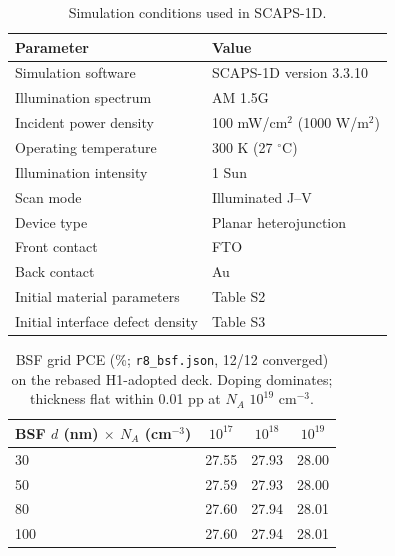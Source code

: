 \documentclass[11pt]{article}
\begin{document}
\begin{table}[htbp]
\centering
{\small\setlength{\tabcolsep}{3pt}
\begin{tabularx}{\textwidth}{XX}
\hline
Parameter & Value
\\\hline
Simulation software & SCAPS-1D version 3.3.10\\
Illumination spectrum & AM 1.5G\\
Incident power density & 100 mW/cm$^{2}$ (1000 W/m$^{2}$)\\
Operating temperature & 300 K (27 $^{\circ}$C)\\
Illumination intensity & 1 Sun\\
Scan mode & Illuminated J--V\\
Device type & Planar heterojunction\\
Front contact & FTO\\
Back contact & Au\\
Initial material parameters & Table S2\\
Initial interface defect density & Table S3\\
\hline
\end{tabularx}
}
\caption{Simulation conditions used in SCAPS-1D.}
\par{}\par
\end{table}
\begin{table}[htbp]
\centering
{\small\setlength{\tabcolsep}{3pt}
\begin{tabularx}{\textwidth}{Xccc}
\hline
BSF $d$ (nm) $\times$ $N_{A}$ (cm$^{-3}$) & $10^{17}$ & $10^{18}$ & $10^{19}$\\
\hline
30 & 27.55 & 27.93 & 28.00\\
50 & 27.59 & 27.93 & 28.00\\
80 & 27.60 & 27.94 & 28.01\\
100 & 27.60 & 27.94 & 28.01\\
\hline
\end{tabularx}}
\caption{BSF grid PCE (\%; \texttt{r8\_bsf.json}, 12/12 converged) on the rebased H1-adopted deck. Doping dominates; thickness flat within 0.01 pp at $N_{A}$ $10^{19}$ cm$^{-3}$.}
\par{}\par
\end{table}
\end{document}
